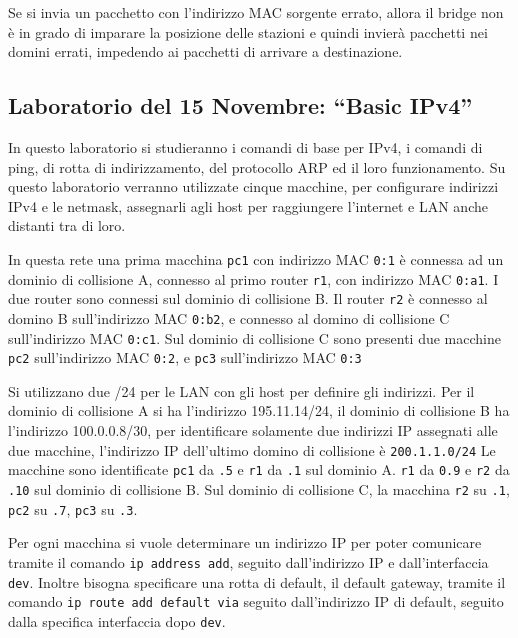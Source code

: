 \documentclass{article}
\numberwithin{equation}{subsection}
\begin{document}
Se si invia un pacchetto con l'indirizzo MAC sorgente errato, allora il bridge non è in grado di imparare la posizione delle stazioni e quindi invierà pacchetti 
nei domini errati, impedendo ai pacchetti di arrivare a destinazione. 

\subsection{Laboratorio del 15 Novembre: ``Basic IPv4''}


In questo laboratorio si studieranno i comandi di base per IPv4, i comandi di ping, di rotta di indirizzamento, del protocollo ARP ed il loro 
funzionamento. 
Su questo laboratorio verranno utilizzate cinque macchine, per configurare indirizzi IPv4 e le netmask, assegnarli agli host per 
raggiungere l'internet e LAN anche distanti tra di loro. 


In questa rete una prima macchina \verb|pc1| con indirizzo MAC \verb|0:1| è connessa ad un dominio di collisione A, connesso al primo router \verb|r1|, 
con indirizzo MAC \verb|0:a1|. I due router sono connessi sul dominio di collisione B. Il router \verb|r2| è connesso al domino B sull'indirizzo 
MAC \verb|0:b2|, e connesso al domino di collisione C sull'indirizzo MAC \verb|0:c1|. Sul dominio di collisione C sono presenti due macchine \verb|pc2| 
sull'indirizzo MAC \verb|0:2|, e \verb|pc3| sull'indirizzo MAC \verb|0:3|


Si utilizzano due /24 per le LAN con gli host per definire gli indirizzi. Per il dominio di collisione A si ha l'indirizzo 195.11.14/24, il 
dominio di collisione B ha l'indirizzo 100.0.0.8/30, per identificare solamente due indirizzi IP assegnati alle due macchine, l'indirizzo 
IP dell'ultimo domino di collisione è \verb|200.1.1.0/24|
Le macchine sono identificate \verb|pc1| da \verb|.5| e \verb|r1| da \verb|.1| sul dominio A. \verb|r1| da \verb|0.9| e \verb|r2| da \verb|.10| sul dominio 
di collisione B. Sul dominio di collisione C, la macchina \verb|r2| su \verb|.1|, \verb|pc2| su \verb|.7|, \verb|pc3| su \verb|.3|. 

Per ogni macchina si vuole determinare un indirizzo IP per poter comunicare tramite il comando \verb|ip address add|, seguito dall'indirizzo IP e dall'interfaccia \verb|dev|. 
Inoltre bisogna specificare una rotta di default, il default gateway, tramite il comando \verb|ip route add default via| seguito dall'indirizzo IP di default, seguito 
dalla specifica interfaccia dopo \verb|dev|. 
\end{document}
